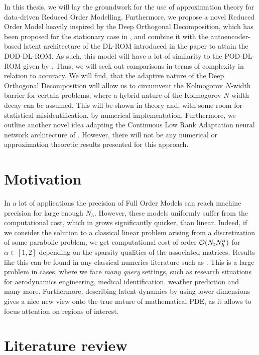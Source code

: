 In this thesis, we will lay the groundwork for 
the use of approximation theory for data-driven
Reduced Order Modelling. Furthermore, we propose a novel Reduced Order Model heavily inspired by the Deep Orthogonal Decomposition,
which has been proposed for the stationary case in \cite{franco2024}, and combine it with the
autoencoder-based latent architecture of the DL-ROM introduced in the paper \cite{fresca2020} to attain
the DOD-DL-ROM. As such, this model will have a lot of similarity to the POD-DL-ROM given by
\cite{fresca2022}. Thus, we will seek out comparisons in terms of complexity in relation to accuracy.
We will find, that the adaptive nature of the Deep Orthogonal Decomposition will allow us
to circumvent the Kolmogorov $N$-width barrier for certain problems, where a hybrid nature of the 
Kolmogorov $N$-width decay can be assumed. This will be shown in theory and, with some room for
statistical misidentification, by numerical implementation. Furthermore, we outline another novel
idea adapting the Continuous Low Rank Adaptation neural network architecture of \cite{berman2024}.
However, there will not be any numerical or approximation theoretic results presented for this approach.


\section{Motivation}



In a lot of applications the precision of Full Order Models can reach machine precision for large enough $N_h$. 
However, these models uniformly suffer from the computational cost, which in grows significantly quicker,
than linear. Indeed, if we consider the solution to a classical linear problem arising from a discretization
of some parabolic problem, we get computational cost of order $\mathcal{O}(N_t N_h^{\alpha})$ for $\alpha \in [1, 2]$
depending on the sparsity qualities of the associated matrices. Results like this can be found in
any classical numerics literature such as \cite{quarteroni2015rb}.
This is a large problem in cases, where we face \emph{many query} settings, such as research situations for
aerodynamics engineering, medical identification, weather prediction and many more. 
Furthermore, describing latent dynamics by using lower dimensions gives a nice new view onto the true nature
of mathematical PDE, as it allows to focus attention on regions of interest.



\section{Literature review}




